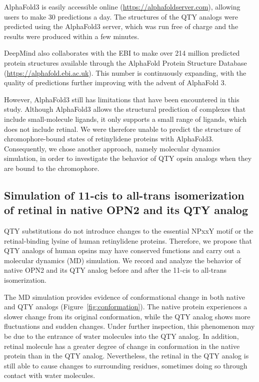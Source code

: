 \documentclass[fleqn, 10pt]{manuscript}
\begin{document}
AlphaFold3 is easily accessible online (\url{https://alphafoldserver.com}), allowing users to make 30 predictions a day. The structures of the QTY analogs were predicted using the AlphaFold3 server, which was run free of charge and the results were produced within a few minutes. 

DeepMind also collaborates with the EBI to make over 214 million predicted protein structures available through the AlphaFold Protein Structure Database (\url{https://alphafold.ebi.ac.uk}). This number is continuously expanding, with the quality of predictions further improving with the advent of AlphaFold 3. 

However, AlphaFold3 still has limitations that have been encountered in this study. Although AlphaFold3 allows the structural prediction of complexes that include small-molecule ligands, it only supports a small range of ligands, which does not include retinal. We were therefore unable to predict the structure of chromophore-bound states of retinylidene proteins with AlphaFold3. Consequently, we chose another approach, namely molecular dynamics simulation, in order to investigate the behavior of QTY opsin analogs when they are bound to the chromophore. 

\subsection*{Simulation of 11-cis to all-trans isomerization of retinal in native OPN2 and its QTY analog}

QTY substitutions do not introduce changes to the essential NPxxY motif or the retinal-binding lysine of human retinylidene proteins. Therefore, we propose that QTY analogs of human opsins may have conserved functions and carry out a molecular dynamics (MD) simulation. We record and analyze the behavior of native OPN2 and its QTY analog before and after the 11-cis to all-trans isomerization. 

The MD simulation provides evidence of conformational change in both native and QTY analogs (Figure~\ref{fig:conformation}). The native protein experiences a slower change from its original conformation, while the QTY analog shows more fluctuations and sudden changes. Under further inspection, this phenomenon may be due to the entrance of water molecules into the QTY analog. In addition, retinal molecule has a greater degree of change in conformation in the native protein than in the QTY analog. Nevertheless, the retinal in the QTY analog is still able to cause changes to surrounding residues, sometimes doing so through contact with water molecules. 
\end{document}
